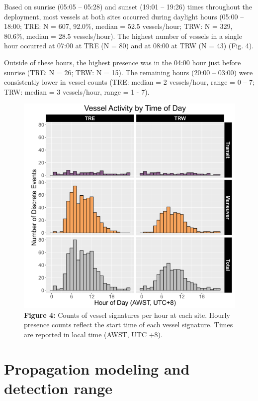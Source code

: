 \documentclass[
  letterpaper,
  oneside,
  open=any]{scrbook}
\begin{document}
Based on sunrise (05:05 -- 05:28) and sunset (19:01 -- 19:26) times
throughout the deployment, most vessels at both sites occurred during
daylight hours (05:00 -- 18:00; TRE: N = 607, 92.0\%, median = 52.5
vessels/hour; TRW: N = 329, 80.6\%, median = 28.5 vessels/hour). The
highest number of vessels in a single hour occurred at 07:00 at TRE (N =
80) and at 08:00 at TRW (N = 43) (Fig. 4).

Outside of these hours, the highest presence was in the 04:00 hour just
before sunrise (TRE: N = 26; TRW: N = 15). The remaining hours (20:00 --
03:00) were consistently lower in vessel counts (TRE: median = 2
vessels/hour, range = 0 -- 7; TRW: median = 3 vessels/hour, range = 1 -
7).

\begin{figure}[H]

{\centering \includegraphics{images/Figure.4.PNG}

}

\caption{\textbf{Figure 4:} Counts of vessel signatures per hour at each
site. Hourly presence counts reflect the start time of each vessel
signature. Times are reported in local time (AWST, UTC +8).}

\end{figure}%

\section{Propagation modeling and detection
range}\label{propagation-modeling-and-detection-range}
\end{document}
